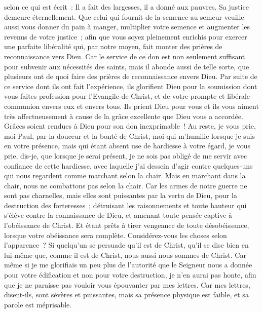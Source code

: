 \begin{multicols}{2}
selon ce qui est écrit~: Il a fait des largesses, il a donné aux pauvres. Sa justice demeure éternellement.
Que celui qui fournit de la semence au semeur veuille aussi vous donner du pain à manger, multiplier votre semence et augmenter les revenus de votre justice~;
afin que vous soyez pleinement enrichis pour exercer une parfaite libéralité qui, par notre moyen, fait monter des prières de reconnaissance vers Dieu.
Car le service de ce don est non seulement suffisant pour subvenir aux nécessités des saints, mais il abonde aussi de telle sorte, que plusieurs ont de quoi faire des prières de reconnaissance envers Dieu.
Par suite de ce service dont ils ont fait l'expérience, ils glorifient Dieu pour la soumission dont vous faites profession pour l'Evangile de Christ, et de votre prompte et libérale communion envers eux et envers tous.
Ils prient Dieu pour vous et ils vous aiment très affectueusement à cause de la grâce excellente que Dieu vous a accordée.
Grâces soient rendues à Dieu pour son don inexprimable~!
\VerseOne{}Au reste, je vous prie, moi Paul, par la douceur et la bonté de Christ, moi qui m'humilie lorsque je suis en votre présence, mais qui étant absent use de hardiesse à votre égard,
je vous prie, dis-je, que lorsque je serai présent, je ne sois pas obligé de me servir avec confiance de cette hardiesse, avec laquelle j'ai dessein d'agir contre quelques-uns qui nous regardent comme marchant selon la chair.
Mais en marchant dans la chair, nous ne combattons pas selon la chair.
Car les armes de notre guerre ne sont pas charnelles, mais elles sont puissantes par la vertu de Dieu, pour la destruction des forteresses~;
détruisant les raisonnements et toute hauteur qui s'élève contre la connaissance de Dieu, et amenant toute pensée captive à l'obéissance de Christ.
Et étant prêts à tirer vengeance de toute désobéissance, lorsque votre obéissance sera complète.
Considérez-vous les choses selon l'apparence~? Si quelqu'un se persuade qu'il est de Christ, qu'il se dise bien en lui-même que, comme il est de Christ, nous aussi nous sommes de Christ.
Car même si je me glorifiais un peu plus de l'autorité que le Seigneur nous a donnée pour votre édification et non pour votre destruction, je n'en aurai pas honte,
afin que je ne paraisse pas vouloir vous épouvanter par mes lettres.
Car mes lettres, disent-ils, sont sévères et puissantes, mais sa présence physique est faible, et sa parole est méprisable.

\end{multicols}
